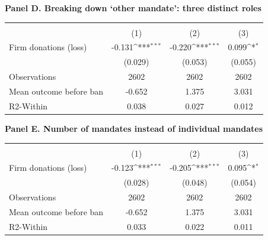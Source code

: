 \documentclass[12pt,a4paper]{article}
\begin{document}
\begin{table}[H]
\bigskip
\textbf{Panel D. Breaking down ‘other mandate’: three distinct roles}\\[1mm]

{
\def\sym#1{\ifmmode^{#1}\else\(^{#1}\)\fi}
\begin{tabular}{l*{3}{c}}
\hline\hline
                &&&\\\cmidrule(lr){2-2}\cmidrule(lr){3-3}\cmidrule(lr){4-4}
                &         &         &         \\
\hline
Firm donations (loss)&   -0.131\sym{***}&   -0.220\sym{***}&    0.099\sym{*}  \\
                &  (0.029)         &  (0.053)         &  (0.055)         \\
\hline
Observations    &     2602         &     2602         &     2602         \\
Mean outcome before ban&   -0.652         &    1.375         &    3.031         \\
R2-Within       &    0.038         &    0.027         &    0.012         \\
\hline\hline
\end{tabular}
}

\bigskip
\textbf{Panel E. Number of mandates instead of individual mandates}\\[1mm]

{
\def\sym#1{\ifmmode^{#1}\else\(^{#1}\)\fi}
\begin{tabular}{l*{3}{c}}
\hline\hline
                &&&\\\cmidrule(lr){2-2}\cmidrule(lr){3-3}\cmidrule(lr){4-4}
                &         &         &         \\
\hline
Firm donations (loss)&   -0.123\sym{***}&   -0.205\sym{***}&    0.095\sym{*}  \\
                &  (0.028)         &  (0.048)         &  (0.054)         \\
\hline
Observations    &     2602         &     2602         &     2602         \\
Mean outcome before ban&   -0.652         &    1.375         &    3.031         \\
R2-Within       &    0.033         &    0.022         &    0.011         \\
\hline\hline
\end{tabular}
}



\end{table}
\end{document}
